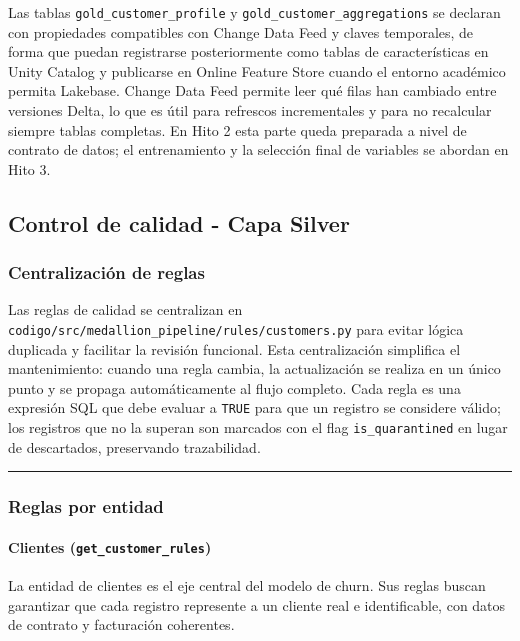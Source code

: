 \documentclass[12pt,a4paper]{article}
\begin{document}
Las tablas \nolinkurl{gold_customer_profile} y \nolinkurl{gold_customer_aggregations} se declaran con propiedades compatibles con Change Data Feed y claves temporales, de forma que puedan registrarse posteriormente como tablas de características en Unity Catalog y publicarse en Online Feature Store cuando el entorno académico permita Lakebase. Change Data Feed permite leer qué filas han cambiado entre versiones Delta, lo que es útil para refrescos incrementales y para no recalcular siempre tablas completas. En Hito 2 esta parte queda preparada a nivel de contrato de datos; el entrenamiento y la selección final de variables se abordan en Hito 3.\par

\subsection{Control de calidad - Capa Silver}

\subsubsection{Centralización de reglas}

Las reglas de calidad se centralizan en \nolinkurl{codigo/src/medallion_pipeline/rules/customers.py} para evitar lógica duplicada y facilitar la revisión funcional. Esta centralización simplifica el mantenimiento: cuando una regla cambia, la actualización se realiza en un único punto y se propaga automáticamente al flujo completo. Cada regla es una expresión SQL que debe evaluar a \nolinkurl{TRUE} para que un registro se considere válido; los registros que no la superan son marcados con el flag \nolinkurl{is_quarantined} en lugar de descartados, preservando trazabilidad.\par

\bigskip\hrule\bigskip

\subsubsection{Reglas por entidad}

\paragraph{Clientes (\nolinkurl{get_customer_rules})}

La entidad de clientes es el eje central del modelo de churn. Sus reglas buscan garantizar que cada registro represente a un cliente real e identificable, con datos de contrato y facturación coherentes.\par
\end{document}
